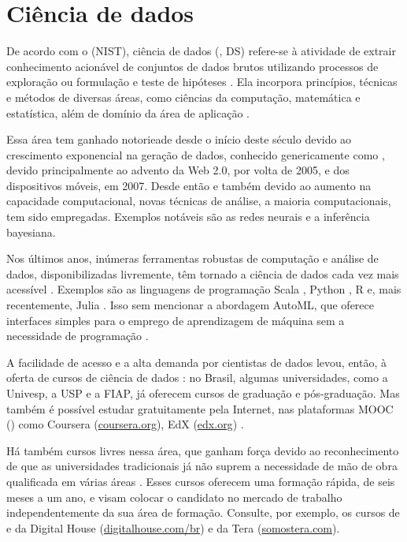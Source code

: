 \section{Ciência de dados}\label{sec:ds}

De acordo com o  (NIST), ciência de dados (, DS) refere-se à atividade de extrair conhecimento acionável de conjuntos de dados brutos utilizando processos de exploração ou formulação e teste de hipóteses \cite[p.~7]{NBDIF2015}.
Ela incorpora princípios, técnicas e métodos de diversas áreas, como ciências da computação, matemática e estatística, além de domínio da área de aplicação \cite{VanderPlas2016}.

Essa área tem ganhado notorieade desde o início deste século devido ao crescimento exponencial na geração de dados, conhecido genericamente como , devido principalmente ao advento da Web 2.0, por volta de 2005, e dos dispositivos móveis, em 2007.
Desde então e também devido ao aumento na capacidade computacional, novas técnicas de análise, a maioria computacionais, tem sido empregadas.
Exemplos notáveis são as redes neurais e a inferência bayesiana.

Nos últimos anos, inúmeras ferramentas robustas de computação e análise de dados, disponibilizadas livremente, têm tornado a ciência de dados cada vez mais acessível \cite{Hayes2019}.
Exemplos são as linguagens de programação Scala \cite{Bugnion2016}, Python \cite{Nagpal2019}, R \cite{James2013} e, mais recentemente, Julia \cite{McNicholas2019}.
Isso sem mencionar a abordagem AutoML, que oferece interfaces simples para o emprego de aprendizagem de máquina sem a necessidade de programação \cite{He2020}.

A facilidade de acesso e a alta demanda por cientistas de dados levou, então, à oferta de cursos de ciência de dados \cite{Hassan2019}: no Brasil, algumas universidades, como a Univesp, a USP e a FIAP, já oferecem cursos de graduação e pós-graduação.
Mas também é possível estudar gratuitamente pela Internet, nas plataformas MOOC () como Coursera (\url{coursera.org}), EdX (\url{edx.org}) \etc.

Há também cursos livres nessa área, que ganham força devido ao reconhecimento de que as universidades tradicionais já não suprem a necessidade de mão de obra qualificada em várias áreas \cite{Zulauf2006}.
Esses cursos oferecem uma formação rápida, de seis meses a um ano, e visam colocar o candidato no mercado de trabalho independentemente da sua área de formação.
Consulte, por exemplo, os cursos de  e  da Digital House (\url{digitalhouse.com/br}) e da Tera (\url{somostera.com}).

